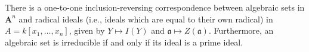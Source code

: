 There is a one-to-one inclusion-reversing correspondence between algebraic sets in $\mathbf{A}^n$ and radical ideals (i.e., ideals which are equal to their own radical) in $A = k[x_1, \ldots, x_n]$, given by $Y \mapsto I(Y)$ and $\mathfrak{a} \mapsto Z(\mathfrak{a})$. Furthermore, an algebraic set is irreducible if and only if its ideal is a prime ideal.
